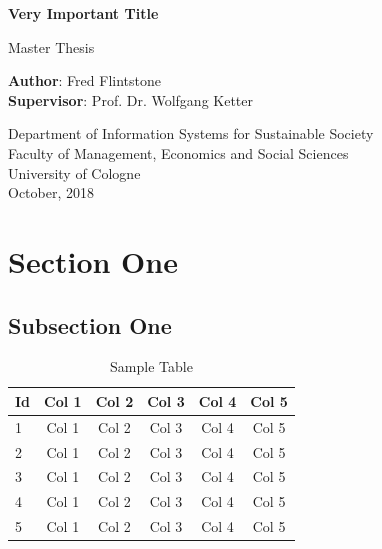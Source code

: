 \documentclass[a4paper]{article}
\begin{document}
\begin{titlepage}
    \begin{center}
        \vspace*{1cm}

        \Large
        \textbf{Very Important Title}

        \vspace{1.5cm}
        Master Thesis

        \vspace{8.0cm}

        \large
        \textbf{Author}: Fred Flintstone\\
        \large
        \textbf{Supervisor}: Prof. Dr. Wolfgang Ketter

        \vspace{1cm}
        \large
        Department of Information Systems for Sustainable Society\\
        Faculty of Management, Economics and Social Sciences\\
        University of Cologne\\

        \vspace{1cm}
        October, 2018

    \end{center}
\end{titlepage}

\tableofcontents
\clearpage
\listoffigures
\clearpage
\listoftables
\clearpage


\section{Section One}
\subsection{Subsection One}
\begin{longtable}{l|ccccc}
  \caption{Sample Table}
  \label{table:table-1}
  \\
  \hline
  \hline
  Id & Col 1 & Col 2 & Col 3 & Col 4 & Col 5\\
  \hline
  1 & Col 1 & Col 2 & Col 3 & Col 4 & Col 5\\
  2 & Col 1 & Col 2 & Col 3 & Col 4 & Col 5\\
  3 & Col 1 & Col 2 & Col 3 & Col 4 & Col 5\\
  4 & Col 1 & Col 2 & Col 3 & Col 4 & Col 5\\
  5 & Col 1 & Col 2 & Col 3 & Col 4 & Col 5\\
  \hline
  \hline
\end{longtable}
\end{document}
